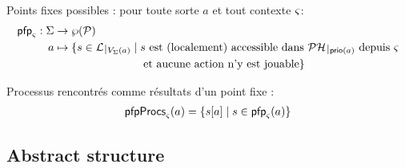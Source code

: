 Points fixes possibles : pour toute sorte $a$ et tout contexte $\varsigma$:
\begin{align*}
  \pfp_\ctx: \PHs &\rightarrow \wp(\PHproc) \\
  a &\mapsto \{ s \in \restriction{\PHl}{\Vs(a)} \mid \text{$s$ est (localement) accessible dans $\restriction{\PH}{\prio(a)}$ depuis $\ctx$}\\
  &\qquad\qquad\qquad\qquad \text{et aucune action n'y est jouable} \}
\end{align*}

Processus rencontrés comme résultats d'un point fixe :
\begin{align*}
\mathsf{pfpProcs}_\varsigma(a) = \{ {s[a]} \mid s \in \mathsf{pfp}_\varsigma(a) \}
\end{align*}


\begin{comment}
Séquences de bonds abstraites :
$$\BS^\wedge(P) = \{ \zeta^\wedge \mid \zeta \in \BS(P), \nexists \zeta' \in \BS(P), \zeta'^\wedge \subsetneq \zeta^\wedge \}$$
where $\zeta^\wedge = (\zeta^\wedge_A, \zeta^\wedge_B, \zeta^\wedge_{max})$ with:
\begin{itemize}
  \item $\zeta^\wedge_A = \{ \PHhitter(\zeta_n) \mid n \in \indexes{\zeta} \wedge \PHsort(\PHhitter(\zeta_n)) \neq \PHsort(P) \}$ : ens. des requis d'autres sortes (frappeurs)
  \item $\zeta^\wedge_B = \{ \PHhitter(\zeta_n) \mid n \in \indexes{\zeta} \} \cup \{ \PHtarget(\zeta_n) \mid n \in \indexes{\zeta} \}$ : ens. des processus nécessaires (à ne pas perturber)
  \item $\zeta^\wedge_{max} = \max_{n \in \indexes{\zeta}}(\prio(\zeta_n))$ : plus faible priorité
\end{itemize}
\end{comment}

\subsection{Abstract structure}

